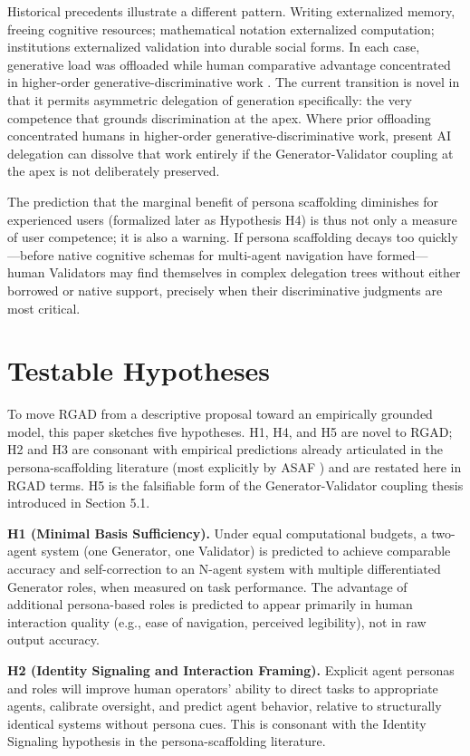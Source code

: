 \documentclass[11pt,a4paper]{article}
\begin{document}
Historical precedents illustrate a different pattern. Writing externalized memory, freeing cognitive resources; mathematical notation externalized computation; institutions externalized validation into durable social forms. In each case, generative load was offloaded while human comparative advantage concentrated in higher-order generative-discriminative work \citep{wef2026, hogberg2026}. The current transition is novel in that it permits asymmetric delegation of generation specifically: the very competence that grounds discrimination at the apex. Where prior offloading concentrated humans in higher-order generative-discriminative work, present AI delegation can dissolve that work entirely if the Generator-Validator coupling at the apex is not deliberately preserved.

The prediction that the marginal benefit of persona scaffolding diminishes for experienced users (formalized later as Hypothesis H4) is thus not only a measure of user competence; it is also a warning. If persona scaffolding decays too quickly---before native cognitive schemas for multi-agent navigation have formed---human Validators may find themselves in complex delegation trees without either borrowed or native support, precisely when their discriminative judgments are most critical.

\section{Testable Hypotheses}
To move RGAD from a descriptive proposal toward an empirically grounded model, this paper sketches five hypotheses. H1, H4, and H5 are novel to RGAD; H2 and H3 are consonant with empirical predictions already articulated in the persona-scaffolding literature (most explicitly by ASAF \citep{lee2026}) and are restated here in RGAD terms. H5 is the falsifiable form of the Generator-Validator coupling thesis introduced in Section 5.1.

\textbf{H1 (Minimal Basis Sufficiency).} Under equal computational budgets, a two-agent system (one Generator, one Validator) is predicted to achieve comparable accuracy and self-correction to an N-agent system with multiple differentiated Generator roles, when measured on task performance. The advantage of additional persona-based roles is predicted to appear primarily in human interaction quality (e.g., ease of navigation, perceived legibility), not in raw output accuracy.

\textbf{H2 (Identity Signaling and Interaction Framing).} Explicit agent personas and roles will improve human operators' ability to direct tasks to appropriate agents, calibrate oversight, and predict agent behavior, relative to structurally identical systems without persona cues. This is consonant with the Identity Signaling hypothesis in the persona-scaffolding literature.
\end{document}
